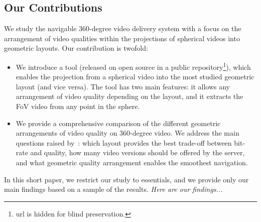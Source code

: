 \subsection{Our Contributions}

%
We study the navigable 360-degree video delivery system with a
focus on the arrangement of video qualities within the projections of
spherical videos into geometric layouts. Our contribution is twofold:
\begin{itemize}
\item We introduce a tool (released on open source in a public
repository\footnote{url is hidden for blind
preservation.}), which enables the projection from a spherical video
into the most studied  geometric layout (and vice versa). The tool has two main
features: it allows
any arrangement of video quality depending on the layout, and it
extracts the
\ac{FoV} video from any point in the sphere.
\item We provide a comprehensive comparison of the different geometric arrangements of
video quality on 360-degree video. We address the main questions raised
by~\citet{facebook}: which layout provides the best trade-off
between bit-rate and
quality, how many video versions should be offered by the server, and what geometric
quality arrangement
enables the smoothest navigation.
\end{itemize}

In this short paper, we restrict our study to essentials, and we provide only our main findings based on a
sample of the results. \textit{Here are our findings...}




